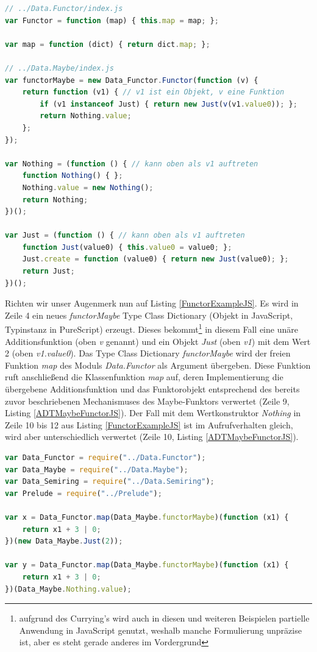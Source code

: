 \documentclass[
12pt,
ngerman,
oneside]
{scrbook} %
\begin{document}
\begin{lstlisting}[language=javascript, style=numbered-and-boxed, caption=Übersetzung der Typklasse \emph{Functor} und Typinstanz \emph{functorMaybe}, label=ADTMaybeFunctorJS]
// ../Data.Functor/index.js
var Functor = function (map) { this.map = map; };

var map = function (dict) { return dict.map; };

// ../Data.Maybe/index.js
var functorMaybe = new Data_Functor.Functor(function (v) {
	return function (v1) { // v1 ist ein Objekt, v eine Funktion
		if (v1 instanceof Just) { return new Just(v(v1.value0)); };
		return Nothing.value;
	};
});

var Nothing = (function () { // kann oben als v1 auftreten 
	function Nothing() { };
	Nothing.value = new Nothing(); 
	return Nothing; 
})();

var Just = (function () { // kann oben als v1 auftreten 
	function Just(value0) { this.value0 = value0; };
	Just.create = function (value0) { return new Just(value0); };
	return Just; 
})();
\end{lstlisting}

Richten wir unser Augenmerk nun auf Listing \ref{FunctorExampleJS}. Es wird in Zeile 4 ein neues \emph{functorMaybe} Type Class Dictionary (Objekt in JavaScript, Typinstanz in PureScript) erzeugt. Dieses bekommt\footnote{aufgrund des Currying's wird auch in diesen und weiteren Beispielen partielle Anwendung in JavaScript genutzt, weshalb manche Formulierung unpräzise ist, aber es steht gerade anderes im Vordergrund} in diesem Fall eine unäre Additionsfunktion (oben \emph{v} genannt) und ein Objekt \emph{Just} (oben \emph{v1}) mit dem Wert 2 (oben \emph{v1.value0}). Das Type Class Dictionary \emph{functorMaybe} wird der freien Funktion \emph{map} des Moduls \emph{Data.Functor} als Argument übergeben. Diese Funktion ruft anschließend die Klassenfunktion \emph{map} auf, deren Implementierung die übergebene Additionsfunktion und das Funktorobjekt entsprechend des bereits zuvor beschriebenen Mechanismuses des Maybe-Funktors verwertet (Zeile 9, Listing \ref{ADTMaybeFunctorJS}). Der Fall mit dem Wertkonstruktor \emph{Nothing} in Zeile 10 bis 12 aus Listing \ref{FunctorExampleJS} ist im Aufrufverhalten gleich, wird aber unterschiedlich verwertet (Zeile 10, Listing \ref{ADTMaybeFunctorJS}).

\begin{lstlisting}[language=javascript, style=numbered-and-boxed, caption=Übersetzung des Maybe-Funktorenbeispiels nach JS, label=FunctorExampleJS]
var Data_Functor = require("../Data.Functor");
var Data_Maybe = require("../Data.Maybe");
var Data_Semiring = require("../Data.Semiring");
var Prelude = require("../Prelude");

var x = Data_Functor.map(Data_Maybe.functorMaybe)(function (x1) {
	return x1 + 3 | 0;
})(new Data_Maybe.Just(2));

var y = Data_Functor.map(Data_Maybe.functorMaybe)(function (x1) {
	return x1 + 3 | 0;
})(Data_Maybe.Nothing.value);
\end{lstlisting}
\end{document}

